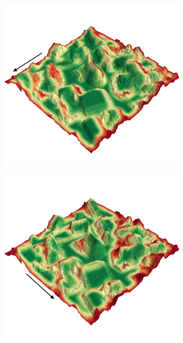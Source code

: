 \documentclass[../document.tex]{subfiles}
\begin{document}
\begin{figure} [htbp]
\begin{subfigure}[b]{0.45\textwidth}
      \includegraphics[width=\linewidth]{../img/4/traversability/sullens/-90.png}
  \end{subfigure}
  \begin{subfigure}[b]{0.45\textwidth}
    \includegraphics[width=\linewidth]{../img/4/traversability/sullens/-0.png}

\end{subfigure}
\end{figure}
\end{document}
